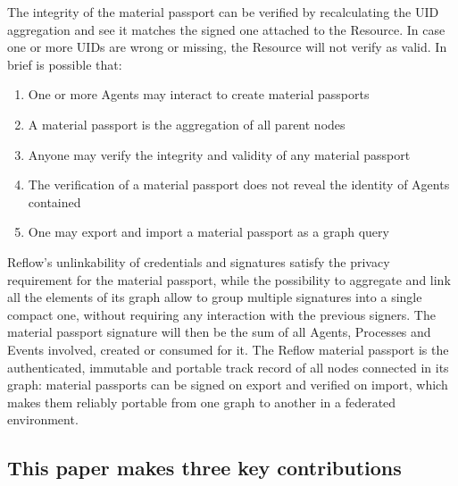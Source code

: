 \documentclass[twocolumn]{article}
\begin{document}
The integrity of the material passport can be verified by recalculating
the UID aggregation and see it matches the signed one attached to the
Resource. In case one or more UIDs are wrong or missing, the Resource
will not verify as valid. In brief is possible that:

\begin{enumerate}
  \item One or more Agents may interact to create material passports
  \item A material passport is the aggregation of all parent nodes
  \item Anyone may verify the integrity and validity of any material passport
  \item The verification of a material passport does not reveal the identity of Agents contained
  \item One may export and import a material passport as a graph query
\end{enumerate}

Reflow's unlinkability of credentials and signatures satisfy the privacy
requirement for the material passport, while the possibility to
aggregate and link all the elements of its graph allow to group multiple
signatures into a single compact one, without requiring any interaction
with the previous signers. The material passport signature will then be
the sum of all Agents, Processes and Events involved, created or
consumed for it. The Reflow material passport is the authenticated,
immutable and portable track record of all nodes connected in its graph:
material passports can be signed on export and verified on import, which
makes them reliably portable from one graph to another in a federated
environment.

\subsection*{This paper makes three key contributions}
\end{document}

